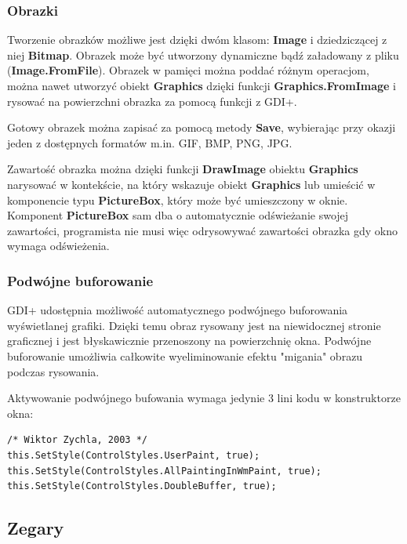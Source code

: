 \subsubsection{Obrazki}

Tworzenie obrazków możliwe jest dzięki dwóm klasom: {\bf Image} i dziedziczącej z niej {\bf Bitmap}.
Obrazek może być utworzony dynamiczne bądź załadowany z pliku ({\bf Image.FromFile}). 
Obrazek w pamięci można poddać różnym operacjom, można nawet utworzyć obiekt {\bf Graphics} dzięki funkcji
{\bf Graphics.FromImage} i rysować na powierzchni obrazka za pomocą funkcji z GDI+.

Gotowy obrazek można zapisać za pomocą metody {\bf Save}, wybierając przy okazji jeden z dostępnych formatów m.in.
GIF, BMP, PNG, JPG.

Zawartość obrazka można dzięki funkcji {\bf DrawImage} obiektu {\bf Graphics} narysować w kontekście, na który
wskazuje obiekt {\bf Graphics} lub umieścić w komponencie typu {\bf PictureBox}, który może być umieszczony
w oknie. Komponent {\bf PictureBox} sam dba o automatycznie odświeżanie swojej zawartości, programista nie musi
więc odrysowywać zawartości obrazka gdy okno wymaga odświeżenia.

\subsubsection{Podwójne buforowanie}

GDI+ udostępnia możliwość automatycznego podwójnego buforowania wyświetlanej grafiki. Dzięki
temu obraz rysowany jest na niewidocznej stronie graficznej i jest błyskawicznie przenoszony na
powierzchnię okna. Podwójne buforowanie umożliwia całkowite wyeliminowanie efektu "migania" obrazu
podczas rysowania. 

Aktywowanie podwójnego bufowania wymaga jedynie 3 lini kodu w konstruktorze okna:

\begin{scriptsize}
\begin{verbatim}
/* Wiktor Zychla, 2003 */
this.SetStyle(ControlStyles.UserPaint, true);
this.SetStyle(ControlStyles.AllPaintingInWmPaint, true);
this.SetStyle(ControlStyles.DoubleBuffer, true);
\end{verbatim}
\end{scriptsize}

\subsection{Zegary}

